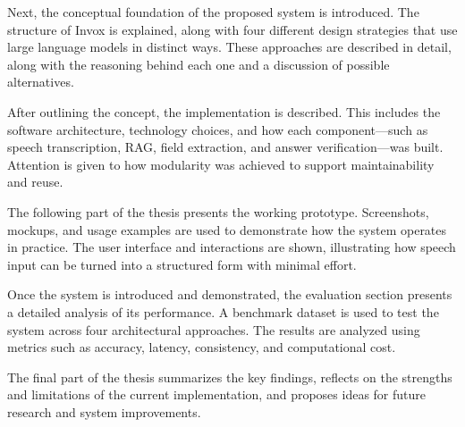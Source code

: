 Next, the conceptual foundation of the proposed system is introduced. The structure of Invox is explained, along with four different design strategies that use large language models in distinct ways. These approaches are described in detail, along with the reasoning behind each one and a discussion of possible alternatives.

After outlining the concept, the implementation is described. This includes the software architecture, technology choices, and how each component—such as speech transcription, RAG, field extraction, and answer verification—was built. Attention is given to how modularity was achieved to support maintainability and reuse.

The following part of the thesis presents the working prototype. Screenshots, mockups, and usage examples are used to demonstrate how the system operates in practice. The user interface and interactions are shown, illustrating how speech input can be turned into a structured form with minimal effort.

Once the system is introduced and demonstrated, the evaluation section presents a detailed analysis of its performance. A benchmark dataset is used to test the system across four architectural approaches. The results are analyzed using metrics such as accuracy, latency, consistency, and computational cost.

The final part of the thesis summarizes the key findings, reflects on the strengths and limitations of the current implementation, and proposes ideas for future research and system improvements.
